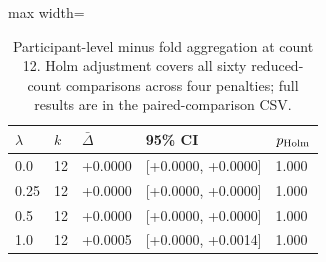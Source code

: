 \begin{table}[htbp]
\centering\small
\caption{Participant-level minus fold aggregation at count 12. Holm adjustment covers all sixty reduced-count comparisons across four penalties; full results are in the paired-comparison CSV.}\label{tab:personextension}
\begin{adjustbox}{max width=\textwidth}
\begin{tabular}{lllll}\toprule
$\lambda$ & $k$ & $\bar\Delta$ & 95\% CI & $p_{\rm Holm}$\\\midrule
0.0 & 12 & +0.0000 & [+0.0000, +0.0000] & 1.000\\
0.25 & 12 & +0.0000 & [+0.0000, +0.0000] & 1.000\\
0.5 & 12 & +0.0000 & [+0.0000, +0.0000] & 1.000\\
1.0 & 12 & +0.0005 & [+0.0000, +0.0014] & 1.000\\
\bottomrule\end{tabular}
\end{adjustbox}
\end{table}

